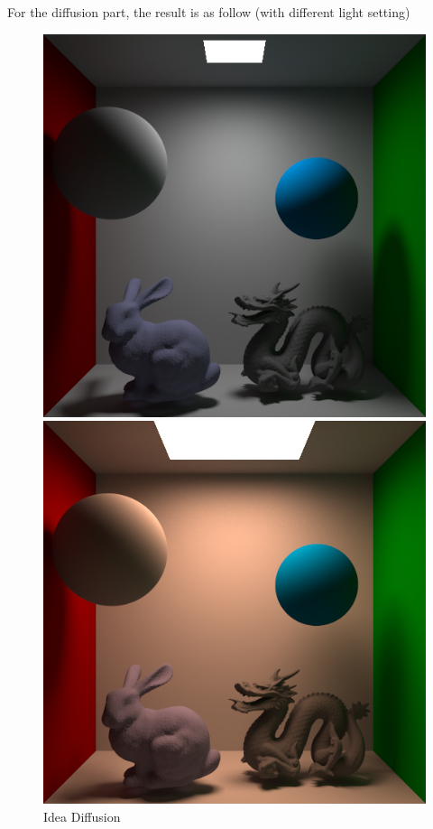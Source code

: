 \documentclass[acmtog]{acmart}
\begin{document}
For the diffusion part, the result is as follow (with different light setting)
\begin{figure}[h]
  \centering
  \includegraphics[scale=0.35]{images/all_diff_1.png}

  \includegraphics[scale=0.35]{images/diff_2048_2_final.png}
  \caption{Idea Diffusion}
\end{figure}
\end{document}
